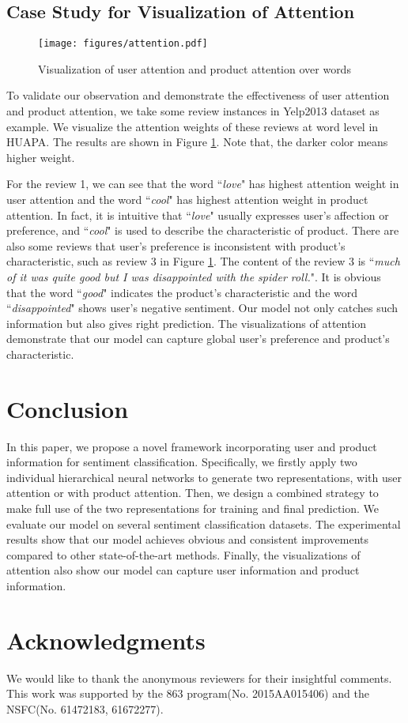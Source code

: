 \documentclass[letterpaper]{article} \usepackage{aaai18}  \usepackage{times}  \usepackage{helvet}  \usepackage{courier}  \usepackage{url}  \usepackage{graphicx}  \frenchspacing  \usepackage{amsmath}
\begin{document}
\subsection{Case Study for Visualization of Attention}
\begin{figure}[ht]
\centering
\texttt{[image: figures/attention.pdf]}
\caption{Visualization of user attention and product attention over words}
\label{fig:attention}
\end{figure}
To validate our observation and demonstrate the effectiveness of user attention and product attention, we take some review instances in Yelp2013 dataset as example. We visualize the attention weights of these reviews at word level in HUAPA. The results are shown in Figure \ref{fig:attention}. Note that, the darker color means higher weight.

For the review 1, we can see that the word ``\textit{love}" has highest attention weight in user attention and the word ``\textit{cool}" has highest attention weight in product attention. In fact, it is intuitive that ``\textit{love}" usually expresses user's  affection or preference, and ``\textit{cool}" is used to describe the characteristic of product. There are also some reviews that user's preference is inconsistent with product's characteristic, such as review 3 in Figure \ref{fig:attention}. The content of the review 3 is ``\textit{much of it was quite good but I was disappointed with the spider roll.}". It is obvious that the word ``\textit{good}" indicates the product's characteristic and the word ``\textit{disappointed}" shows user's negative sentiment. Our model not only catches such information but also gives right prediction. The visualizations of attention demonstrate that our model can capture global user's preference and product's characteristic.


\section{Conclusion}
In this paper, we propose a novel framework incorporating user and product information for sentiment classification. Specifically, we firstly apply two individual hierarchical neural networks to generate two representations, with user attention or with product attention. Then, we design a combined strategy to make full use of the two representations for training and final prediction. We evaluate our model on several sentiment classification datasets. The experimental results show that our model achieves obvious and consistent improvements compared to other state-of-the-art methods. Finally, the visualizations of attention also show our model can capture user information and product information.

\section{Acknowledgments}
We would like to thank the anonymous reviewers for their insightful comments. This work was supported by the 863 program(No. 2015AA015406) and the NSFC(No. 61472183, 61672277).



\end{document}
